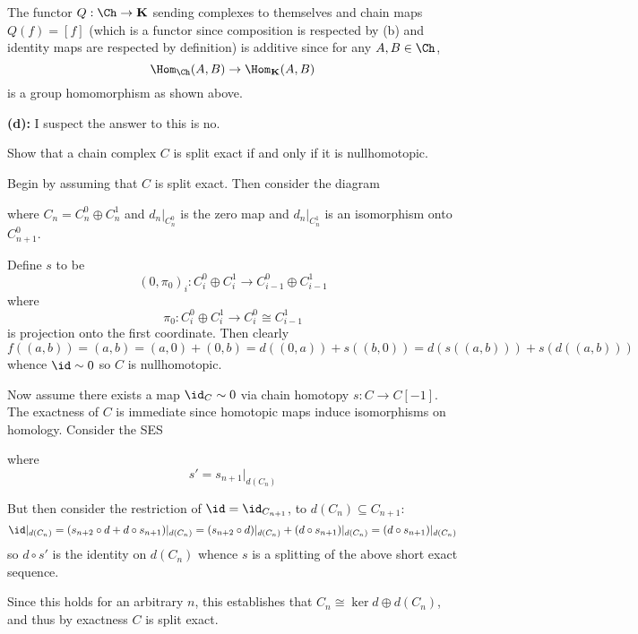 \documentclass[12pt]{article}
\begin{document}
\begin{sol}
	The functor $Q:\Ch\to\mathbf K$ sending complexes to themselves and chain maps $Q(f)=[f]$ (which is
	a functor since composition is respected by (b) and identity maps are respected by definition)
	is additive since for any $A,B\in \Ch$,
	\[\Hom_{\Ch}(A,B)\to \Hom_{\mathbf K}(A,B)\]
	is a group homomorphism as shown above.

	\vspace{2ex}\noindent\textbf{(d):} I suspect the answer to this is no.
\end{sol}

\begin{prob}
	Show that a chain complex $C$ is split exact if and only if it is nullhomotopic.
\end{prob}
\begin{sol}
	Begin by assuming that $C$ is split exact. Then consider the diagram
	
	\begin{center}
	\end{center}

	\noindent where $C_n=C_n^0\oplus C_n^1$ and $d_n|_{C_n^0}$ is the zero map and $d_n|_{C_n^1}$ is 
	an isomorphism onto $C_{n+1}^0.$ 
	
	Define $s$ to be 
	\[(0,\pi_0)_i:C_i^0\oplus C_i^1\to C_{i-1}^0\oplus C_{i-1}^1\]
	where 
	\[\pi_0:C_i^0\oplus C_i^1\to C_i^0\cong C_{i-1}^1\]
	is projection onto the first coordinate. Then clearly 
	\[f((a,b))=(a,b)=(a,0)+(0,b)=d((0,a))+s((b,0))=d(s((a,b)))+s(d((a,b)))\]
	whence $\id\sim 0$ so $C$ is nullhomotopic.

	\brk

	Now assume there exists a map $\id_C\sim 0$ via chain homotopy $s:C\to C[-1]$. The exactness of 
	$C$ is immediate since homotopic maps induce isomorphisms on homology. Consider the SES

	\begin{center}
	\end{center}
	
	\noindent where 
	\[s'=s_{n+1}|_{d(C_n)}\]

	But then consider the restriction of $\id =\id_{C_{n+1}}$, to $d(C_n)\subseteq C_{n+1}$:
	\[\id|_{d(C_n)}=(s_{n+2}\circ d+d\circ s_{n+1})|_{d(C_n)}=(s_{n+2}\circ d)|_{d(C_n)}+(d\circ s_{n+1})|_{d(C_n)}=(d\circ s_{n+1})|_{d(C_n)}\]
	so $d\circ s'$ is the identity on $d(C_n)$ whence $s$ is a splitting of the above short exact sequence.

	Since this holds for an arbitrary $n$, this establishes that $C_n\cong \ker d\oplus d(C_n)$, 
	and thus by exactness $C$ is split exact.
\end{sol}
\end{document}
